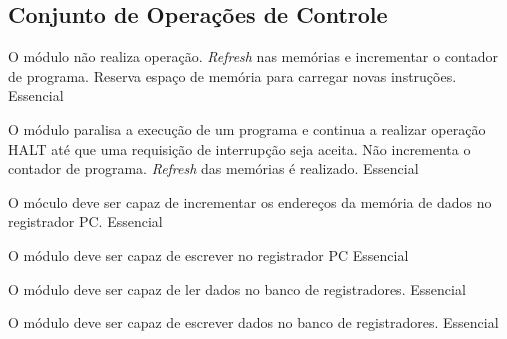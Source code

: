 \subsection{Conjunto de Operações de Controle}
	    
	\begin{functional}
		
		{O módulo não realiza operação. \textit{Refresh} nas memórias e incrementar o contador de programa. Reserva espaço de memória para carregar novas instruções.}
		{Essencial} 
       
        {O módulo paralisa a execução de um programa e continua a realizar operação HALT até que uma requisição de interrupção seja aceita. Não incrementa o contador de programa. \textit{Refresh} das memórias é realizado.}
        {Essencial}
        
        {O móculo deve ser capaz de incrementar os endereços da memória de dados no registrador PC.}
 		{Essencial}
 		
 		{O módulo deve ser capaz de escrever no registrador PC}
 		{Essencial}  
 		
 		{O módulo deve ser capaz de ler dados no banco de registradores.}
 		{Essencial}
 		
 		
 		{O módulo deve ser capaz de escrever dados no banco de registradores.}
 		{Essencial}
 		
	  \end{functional}